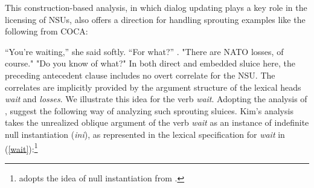{This construction-based analysis, in which dialog updating plays
a key role in the licensing of NSUs, also offers a direction
for handling sprouting examples like the following from COCA:

\eal
\label{spr}
\ex  ``You're waiting,'' she said softly. ``For what?'' 
\label{spr1}.
\ex "There are NATO losses, of course." "Do you know of what?"
\label{spr2}
\zl
%
In both direct and embedded sluice here, the preceding antecedent clause includes no overt correlate for the NSU. The correlates are implicitly provided by the argument structure 
of the lexical heads \textit{wait} and {\it losses}.  We illustrate this idea for the verb {\it wait}. Adopting the analysis of \citet{Ginzburg:Sag:2000}, \citet{Kim2015} suggest the following way of analyzing such sprouting
sluices.  Kim's analysis takes the unrealized oblique argument of the verb \textit{wait} as an instance of indefinite null instantiation (\emph{ini}), as represented in 
the lexical specification for \textit{wait} in
(\ref{wait}):\footnote{\citet{Kim2015} adopts the idea of null
instantiation from \citet{Ruppenhofer2014}.
}

}
